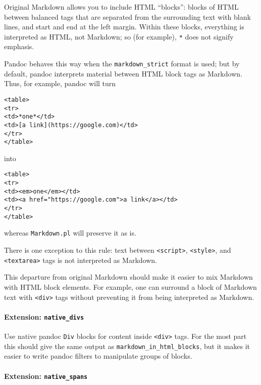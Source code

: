 Original Markdown allows you to include HTML ``blocks'': blocks of HTML
between balanced tags that are separated from the surrounding text with
blank lines, and start and end at the left margin. Within these blocks,
everything is interpreted as HTML, not Markdown; so (for example),
\texttt{*} does not signify emphasis.

Pandoc behaves this way when the \texttt{markdown\_strict} format is
used; but by default, pandoc interprets material between HTML block tags
as Markdown. Thus, for example, pandoc will turn

\begin{verbatim}
<table>
<tr>
<td>*one*</td>
<td>[a link](https://google.com)</td>
</tr>
</table>
\end{verbatim}

into

\begin{verbatim}
<table>
<tr>
<td><em>one</em></td>
<td><a href="https://google.com">a link</a></td>
</tr>
</table>
\end{verbatim}

whereas \texttt{Markdown.pl} will preserve it as is.

There is one exception to this rule: text between
\texttt{\textless{}script\textgreater{}},
\texttt{\textless{}style\textgreater{}}, and
\texttt{\textless{}textarea\textgreater{}} tags is not interpreted as
Markdown.

This departure from original Markdown should make it easier to mix
Markdown with HTML block elements. For example, one can surround a block
of Markdown text with \texttt{\textless{}div\textgreater{}} tags without
preventing it from being interpreted as Markdown.

\hypertarget{extension-native_divs}{%
\paragraph{\texorpdfstring{Extension:
\texttt{native\_divs}}{Extension: native\_divs}}\label{extension-native_divs}}

Use native pandoc \texttt{Div} blocks for content inside
\texttt{\textless{}div\textgreater{}} tags. For the most part this
should give the same output as \texttt{markdown\_in\_html\_blocks}, but
it makes it easier to write pandoc filters to manipulate groups of
blocks.

\hypertarget{extension-native_spans}{%
\paragraph{\texorpdfstring{Extension:
\texttt{native\_spans}}{Extension: native\_spans}}\label{extension-native_spans}}

